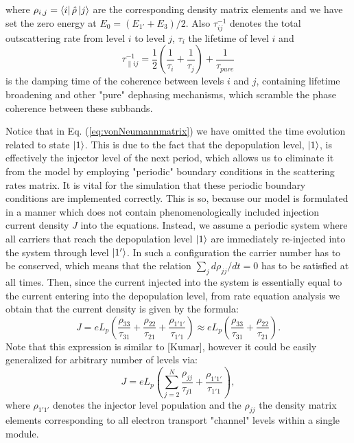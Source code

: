\documentclass[10pt,letterpaper]{article}
\begin{document}
where $\rho_{i,j} = \Bra{i} \hat{\rho} \Ket{j}$ are the corresponding density matrix elements and we have set the zero energy at $E_0 = (E_{1'}+E_{3})/2 $. Also $\tau_{ij}^{-1}$ denotes the total outscattering rate from level $i$ to level $j$, $\tau_{i}$ the lifetime of level $i$ and
$$
	\tau_{\parallel ij}^{-1} = \frac{1}{2}(\frac{1}{\tau_{i}} +\frac{1}{\tau_{j}}) + \frac{1}{\tau_{pure}}   
$$
is the damping time of the coherence between levels $i$ and $j$, containing lifetime broadening and other "pure" dephasing mechanisms, which scramble the phase coherence between these subbands. 

Notice that in Eq. (\ref{eq:vonNeumannmatrix}) we have omitted the time evolution related to state $\Ket{1}$. This is due to the fact that the depopulation level, $\Ket{1}$, is effectively the injector level of the next period, which allows us to eliminate it from the model by employing "periodic" boundary conditions in the scattering rates matrix. It is vital for the simulation that these periodic boundary conditions are implemented correctly. This is so, because our model is formulated in a manner which does not contain phenomenologically included injection current density $J$ into the equations. Instead, we assume a periodic system where all carriers that reach the depopulation level $\Ket{1}$ are immediately re-injected into the system through level $\Ket{1'}$. In such a configuration the carrier number has to be conserved, which means that the relation $\sum_{j} d \rho_{jj}/dt =0 $ has to be satisfied at all times. Then, since the current injected into the system is essentially equal to the current entering into the depopulation level, from rate equation analysis we obtain that the current density is given by the formula:
\begin{equation}
\label{eq:currentdensity}
J = e L_p \left( \frac{\rho_{33}}{\tau_{31}} + \frac{\rho_{22}}{\tau_{21}} + \frac{\rho_{1'1'}}{\tau_{1'1}} \right)\approx e L_p \left( \frac{\rho_{33}}{\tau_{31}} + \frac{\rho_{22}}{\tau_{21}}  \right).  
\end{equation}
Note that this expression is similar to [Kumar], however it could be easily generalized for arbitrary number of levels via:
\begin{equation}
J = e L_p \left( \sum_{j=2}^{N}\frac{\rho_{jj}}{\tau_{j1}} + \frac{\rho_{1'1'}}{\tau_{1'1}} \right),
\end{equation}
where $\rho_{1'1'}$ denotes the injector level population and the $\rho_{jj}$ the density matrix elements corresponding to all electron transport "channel" levels within a single module.   
\end{document}

